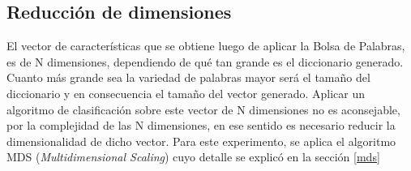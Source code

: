 \subsection{Reducción de dimensiones}

El vector de características que se obtiene luego de aplicar la Bolsa de Palabras, es de N dimensiones, dependiendo de qué tan grande es el diccionario generado. Cuanto más grande sea la variedad de palabras mayor será el tamaño del diccionario y en consecuencia el tamaño del vector generado.
Aplicar un algoritmo de clasificación sobre este vector de N dimensiones no es aconsejable, por la complejidad de las N dimensiones, en ese sentido es necesario reducir la dimensionalidad de dicho vector. Para este experimento, se aplica el algoritmo MDS (\emph{Multidimensional Scaling}) cuyo detalle se explicó en la sección
\ref{mds}